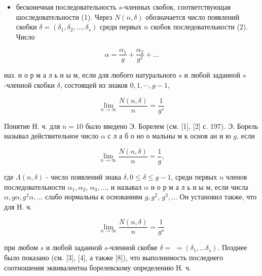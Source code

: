 \documentclass[10pt]{article}
\begin{document}
\begin{itemize}

  \item бесконечная последовательность $s$-членных скобок, соответствующая шоследовательности (1). Через $N(n, \delta)$ обозначается число появлений скобки $\delta=\left(\delta_{1}, \delta_{2}, \ldots, \delta_{s}\right)$ среди первых $n$ скобок последовательности (2). Число

\end{itemize}



\[

\alpha=\frac{\alpha_{1}}{g}+\frac{\alpha_{2}}{g^{2}}+\ldots

\]



наз. н о р м а л ь н ы м, если для любого натурального $s$ и любой заданной $s$-членной скобки $\delta$, состоящей из знаков $0,1, \cdots, g-1$,



\[

\lim _{n \rightarrow \infty} \frac{N(n, \delta)}{n}=\frac{1}{g^{s}}

\]



Понятие Н. ч. для $n=10$ было введено Э. Борелем (см. [1], [2] с. 197). Э. Борель называл действительное число $\alpha$ с л а б о но о мальны м к основ ан и ю $g$, если



\[

\lim _{n \rightarrow \infty} \frac{N(n, \delta)}{n}=\frac{1}{g},

\]



где $\Lambda(n, \delta)$ - число появлений знака $\delta, 0 \leqslant \delta \leqslant g-1$, среди первых $n$ членов последовательности $\alpha_{1}, \alpha_{2}$, $\alpha_{3}, \ldots$, и называл $\alpha$ н о р м а л ь н ы м, если числа $\alpha, g \alpha, g^{2} \alpha, \ldots$ слабо нормальны к основаниям $g, g^{2}$, $g^{3}, \ldots$ Он установил также, что для Н. ч.



\[

\lim _{n \rightarrow \infty} \frac{N(n, \delta)}{n}=\frac{1}{g^{s}}

\]



при любом $s$ и любой заданной $s$-членной скобке $\delta=$ $=\left(\delta_{1}, \ldots \delta_{s}\right)$. Позднее было показано (см. [3], [4], а также [8]), что выполнимость последнего соотношения эквивалентна борелевскому определению Н. ч.
\end{document}
